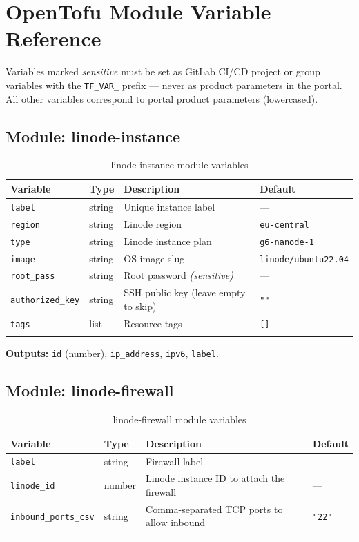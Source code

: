 \documentclass[12pt,a4paper,twoside]{report}
\newcommand{\code}[1]{\texttt{#1}}
\begin{document}
\chapter{OpenTofu Module Variable Reference}
\label{app:tofu-vars}
\footnotesize

Variables marked \textit{sensitive} must be set as GitLab CI/CD project
or group variables with the \code{TF\_VAR\_} prefix — never as product
parameters in the portal. All other variables correspond to portal
product parameters (lowercased).

\section{Module: linode-instance}

\begin{longtable}{@{}L{4.2cm}lL{5.3cm}l@{}}
  \toprule
  \textbf{Variable} & \textbf{Type} & \textbf{Description} & \textbf{Default} \\
  \midrule
  \endhead
  \code{label}           & string & Unique instance label              & — \\
  \code{region}          & string & Linode region                      & \code{eu-central} \\
  \code{type}            & string & Linode instance plan               & \code{g6-nanode-1} \\
  \code{image}           & string & OS image slug                      & \code{linode/ubuntu22.04} \\
  \code{root\_pass}      & string & Root password \textit{(sensitive)} & — \\
  \code{authorized\_key} & string & SSH public key (leave empty to skip) & \code{""} \\
  \code{tags}            & list   & Resource tags                      & \code{[]} \\
  \bottomrule
  \caption{linode-instance module variables}
\end{longtable}

\textbf{Outputs:} \code{id} (number), \code{ip\_address}, \code{ipv6}, \code{label}.

\section{Module: linode-firewall}

\begin{longtable}{@{}L{4.2cm}lL{5.3cm}l@{}}
  \toprule
  \textbf{Variable} & \textbf{Type} & \textbf{Description} & \textbf{Default} \\
  \midrule
  \endhead
  \code{label}               & string & Firewall label                              & — \\
  \code{linode\_id}          & number & Linode instance ID to attach the firewall   & — \\
  \code{inbound\_ports\_csv} & string & Comma-separated TCP ports to allow inbound  & \code{"22"} \\
  \bottomrule
  \caption{linode-firewall module variables}
\end{longtable}
\end{document}
